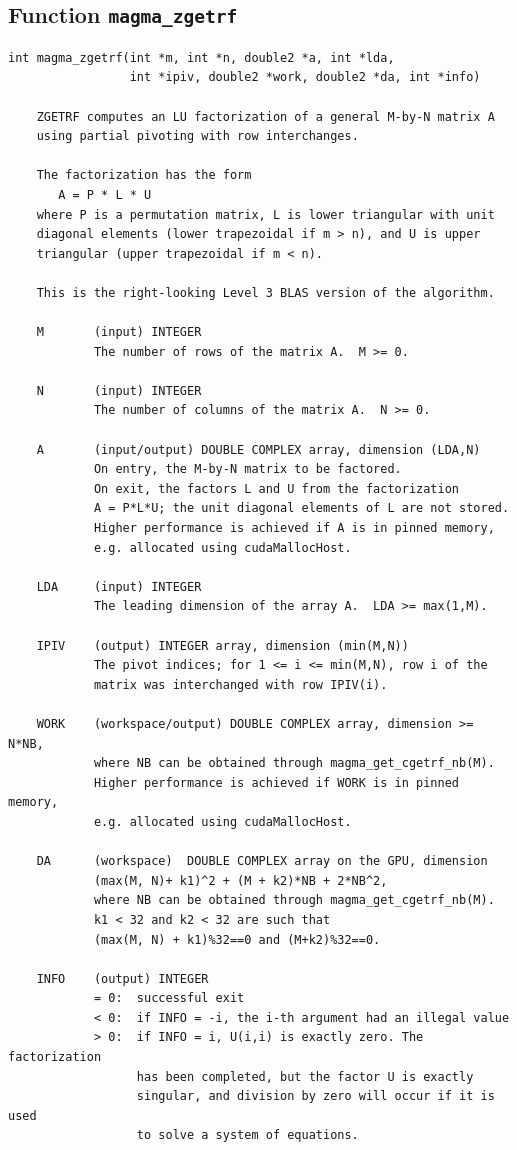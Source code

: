 \documentclass[10pt]{book}
\begin{document}
\newpage
\subsection{Function {\tt {\bf magma\_zgetrf}}}
\begin{verbatim}
int magma_zgetrf(int *m, int *n, double2 *a, int *lda, 
                 int *ipiv, double2 *work, double2 *da, int *info)
   
    ZGETRF computes an LU factorization of a general M-by-N matrix A   
    using partial pivoting with row interchanges.   

    The factorization has the form   
       A = P * L * U   
    where P is a permutation matrix, L is lower triangular with unit   
    diagonal elements (lower trapezoidal if m > n), and U is upper   
    triangular (upper trapezoidal if m < n).   

    This is the right-looking Level 3 BLAS version of the algorithm.   

    M       (input) INTEGER   
            The number of rows of the matrix A.  M >= 0.   

    N       (input) INTEGER   
            The number of columns of the matrix A.  N >= 0.   

    A       (input/output) DOUBLE COMPLEX array, dimension (LDA,N)   
            On entry, the M-by-N matrix to be factored.   
            On exit, the factors L and U from the factorization   
            A = P*L*U; the unit diagonal elements of L are not stored.   
            Higher performance is achieved if A is in pinned memory, 
            e.g. allocated using cudaMallocHost.

    LDA     (input) INTEGER   
            The leading dimension of the array A.  LDA >= max(1,M).   

    IPIV    (output) INTEGER array, dimension (min(M,N))   
            The pivot indices; for 1 <= i <= min(M,N), row i of the   
            matrix was interchanged with row IPIV(i).   

    WORK    (workspace/output) DOUBLE COMPLEX array, dimension >= N*NB,
            where NB can be obtained through magma_get_cgetrf_nb(M).
            Higher performance is achieved if WORK is in pinned memory, 
            e.g. allocated using cudaMallocHost.

    DA      (workspace)  DOUBLE COMPLEX array on the GPU, dimension 
            (max(M, N)+ k1)^2 + (M + k2)*NB + 2*NB^2,
            where NB can be obtained through magma_get_cgetrf_nb(M).
            k1 < 32 and k2 < 32 are such that 
            (max(M, N) + k1)%32==0 and (M+k2)%32==0.

    INFO    (output) INTEGER   
            = 0:  successful exit   
            < 0:  if INFO = -i, the i-th argument had an illegal value   
            > 0:  if INFO = i, U(i,i) is exactly zero. The factorization   
                  has been completed, but the factor U is exactly   
                  singular, and division by zero will occur if it is used   
                  to solve a system of equations.   
\end{verbatim}
\end{document}

